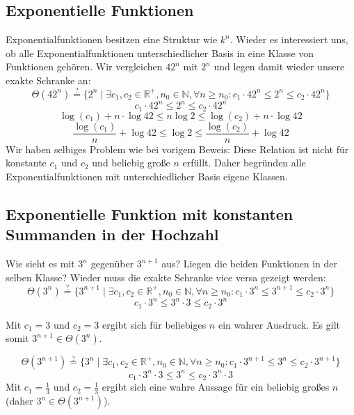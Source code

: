\subsection{Exponentielle Funktionen}
%
Exponentialfunktionen besitzen eine Struktur wie $k^n$. Wieder es interessiert uns, ob alle Exponentialfunktionen unterschiedlicher Basis in eine Klasse von Funktionen gehören. Wir vergleichen ${42}^n$ mit $2^n$ und legen damit wieder unsere exakte Schranke an:
\[
  \Theta({42}^n) \stackrel{?}{=} \{ 2^n \mid \exists c_1, c_2 \in \mathbb{R}^+, n_0 \in \mathbb{N},
                                    \forall n \geq n_0: c_1 \cdot {42}^n \leq 2^n \leq c_2 \cdot {42}^n \}
\] \[
  c_1 \cdot {42}^n \leq 2^n \leq c_2 \cdot {42}^n
\] \[
  \log(c_1) + n\cdot\log{42} \leq n\log{2} \leq \log(c_2) + n\cdot\log{42}
\] \[
  \frac{\log(c_1)}{n} + \log{42} \leq \log{2} \leq \frac{\log(c_2)}{n} + \log{42}
\]
Wir haben selbiges Problem wie bei vorigem Beweis: Diese Relation ist nicht für konstante $c_1$ und $c_2$ und beliebig große $n$ erfüllt. Daher begründen alle Exponentialfunktionen mit unterschiedlicher Basis eigene Klassen.

\subsection{Exponentielle Funktion mit konstanten Summanden in der Hochzahl}
%
Wie sieht es mit $3^n$ gegenüber $3^{n+1}$ aus? Liegen die beiden Funktionen in der selben Klasse?
Wieder muss die exakte Schranke vice versa gezeigt werden:
%
\[
  \Theta(3^n) \stackrel{?}{=} \{ 3^{n+1} \mid \exists c_1, c_2 \in \mathbb{R}^+, n_0 \in \mathbb{N},
                                 \forall n \geq n_0: c_1 \cdot {3}^n \leq 3^{n+1} \leq c_2 \cdot {3}^n \}
\] \[
  c_1 \cdot 3^n \leq 3^n \cdot 3 \leq c_2 \cdot {3}^n
\]%

Mit $c_1 = 3$ und $c_2 = 3$ ergibt sich für beliebiges $n$ ein wahrer Ausdruck. Es gilt somit $3^{n+1} \in \Theta(3^n)$.

\[
  \Theta(3^{n+1}) \stackrel{?}{=} \{ 3^n \mid \exists c_1, c_2 \in \mathbb{R}^+, n_0 \in \mathbb{N},
                                     \forall n \geq n_0: c_1 \cdot {3}^{n+1} \leq 3^n \leq c_2 \cdot 3^{n+1} \}
\] \[
  c_1 \cdot 3^n \cdot 3 \leq 3^n \leq c_2 \cdot 3^n \cdot 3
\]
Mit $c_1 = \frac{1}{3}$ und $c_2 = \frac{1}{3}$ ergibt sich eine wahre Aussage für ein beliebig großes $n$ (daher $3^n \in \Theta(3^{n+1})$).

